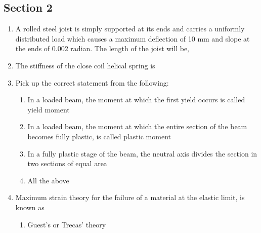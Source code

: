\documentclass[11pt,a4paper]{article}
\begin{document}
\subsection*{Section 2}
\begin{enumerate}
\item{A rolled steel joist is simply supported at its ends and carries a uniformly distributed load which causes a maximum deflection of 10 mm and slope at the ends of 0.002 radian. The length of the joist will be,}
\\
\item{The stiffness of the close coil helical spring is}
\\
\item{Pick up the correct statement from the following:}
\begin{enumerate}[label=\Alph*.]
\item{In a loaded beam, the moment at which the first yield occurs is called yield moment}
\item{In a loaded beam, the moment at which the entire section of the beam becomes fully plastic, is called plastic moment}
\item{In a fully plastic stage of the beam, the neutral axis divides the section in two sections of equal area}
\item{All the above}
\end{enumerate}
\item{Maximum strain theory for the failure of a material at the elastic limit, is known as}
\begin{enumerate}[label=\Alph*.]
\item{Guest's or Trecas' theory}

\end{enumerate}
\end{enumerate}
\end{document}
